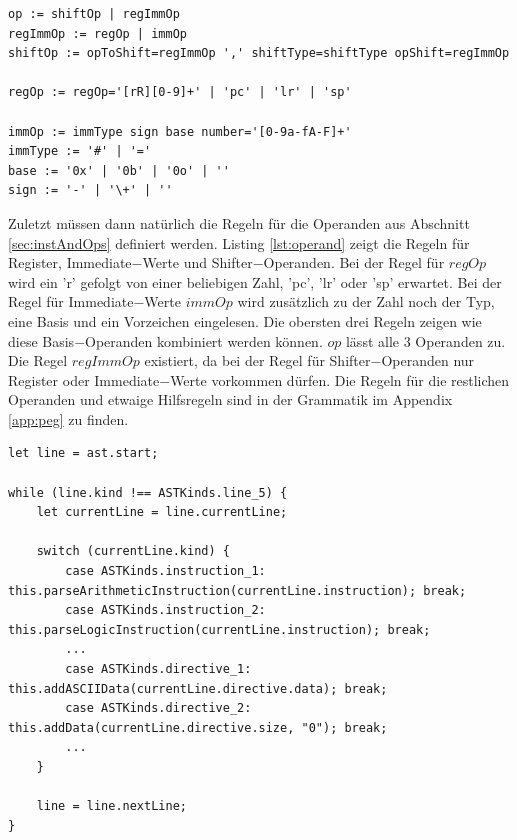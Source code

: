 \documentclass[a4paper, 11pt, onecolumn]{article}
\begin{document}
\begin{lstlisting}[basicstyle=\ttfamily\footnotesize, backgroundcolor=\color{backcolour}, caption={[Grammatik $-$ Operanden]Operanden}, captionpos=b, label={lst:operand},float,floatplacement=H]
op := shiftOp | regImmOp
regImmOp := regOp | immOp
shiftOp := opToShift=regImmOp ',' shiftType=shiftType opShift=regImmOp

regOp := regOp='[rR][0-9]+' | 'pc' | 'lr' | 'sp'

immOp := immType sign base number='[0-9a-fA-F]+'
immType := '#' | '='
base := '0x' | '0b' | '0o' | ''
sign := '-' | '\+' | ''
\end{lstlisting}

Zuletzt müssen dann natürlich die Regeln für die Operanden aus Abschnitt \ref{sec:instAndOps} definiert werden. Listing \ref{lst:operand} zeigt die Regeln für Register, Immediate$-$Werte und Shifter$-$Operanden. Bei der Regel für $regOp$ wird ein 'r' gefolgt von einer beliebigen Zahl, 'pc', 'lr' oder 'sp' erwartet. Bei der Regel für Immediate$-$Werte $immOp$ wird zusätzlich zu der Zahl noch der Typ, eine Basis und ein Vorzeichen eingelesen. Die obersten drei Regeln zeigen wie diese Basis$-$Operanden kombiniert werden können. $op$ lässt alle 3 Operanden zu. Die Regel $regImmOp$ existiert, da bei der Regel für Shifter$-$Operanden nur Register oder Immediate$-$Werte vorkommen dürfen. Die Regeln für die restlichen Operanden und etwaige Hilfsregeln sind in der Grammatik im Appendix \ref{app:peg} zu finden.\\

\begin{lstlisting}[style=JavaScript, basicstyle=\footnotesize, backgroundcolor=\color{backcolour}, caption={[Funktion $-$ Abarbeiten des Syntaxbaumes]Abarbeiten des abstrakten Syntaxbaumes in UserInputParser.ts}, captionpos=b, label={lst:userinputparser}]
let line = ast.start;

while (line.kind !== ASTKinds.line_5) {
    let currentLine = line.currentLine;

    switch (currentLine.kind) {
        case ASTKinds.instruction_1: this.parseArithmeticInstruction(currentLine.instruction); break;
        case ASTKinds.instruction_2: this.parseLogicInstruction(currentLine.instruction); break;
        ...
        case ASTKinds.directive_1: this.addASCIIData(currentLine.directive.data); break;
        case ASTKinds.directive_2: this.addData(currentLine.directive.size, "0"); break;
        ...
    }

    line = line.nextLine;
}
\end{lstlisting}
\end{document}
